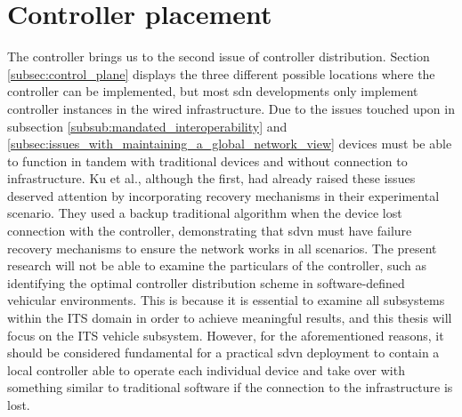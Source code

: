 \section{Controller placement}
The controller brings us to the second issue of controller distribution. Section \ref{subsec:control_plane} displays the three different possible locations where the controller can be implemented, but most \gls{sdn} developments only implement controller instances in the wired infrastructure. Due to the issues touched upon in subsection \ref{subsub:mandated_interoperability} and \ref{subsec:issues_with_maintaining_a_global_network_view} devices must be able to function in tandem with traditional devices and without connection to infrastructure. 
Ku et al.\cite{ku_towards_2014}, although the first, had already raised these issues deserved attention by incorporating recovery mechanisms in their experimental scenario. They used a backup traditional algorithm when the device lost connection with the controller, demonstrating that \gls{sdvn} must have failure recovery mechanisms to ensure the network works in all scenarios.
The present research will not be able to examine the particulars of the controller, such as identifying the optimal controller distribution scheme in software-defined vehicular environments. This is because it is essential to examine all subsystems within the ITS domain in order to achieve meaningful results, and this thesis will focus on the ITS vehicle subsystem.
However, for the aforementioned reasons, it should be considered fundamental for a practical \gls{sdvn} deployment to contain a local controller able to operate each individual device and take over with something similar to traditional software if the connection to the infrastructure is lost. 
    